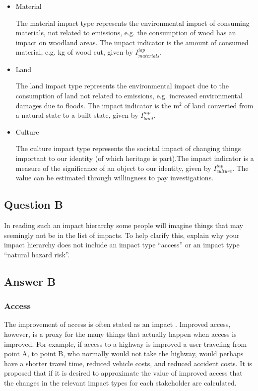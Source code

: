 \begin{enumerate}
\begin{itemize}
\item Material

The material impact type represents the environmental impact of consuming materials, not related to emissions, e.g. the consumption of wood has an impact on woodland areas. The impact indicator is the amount of consumed material, e.g. kg of wood cut, given by $I_{materials}^{iap}$. 

\item Land

The land impact type represents the environmental impact due to the consumption of land not related to emissions, e.g. increased environmental damages due to floods. The impact indicator is the m$^{2}$ of land converted from a natural state to a built state, given by $I_{land}^{iap}$. 

\item Culture

The culture impact type represents the societal impact of changing things important to our identity (of which heritage is part).The impact indicator is a measure of the significance of an object to our identity, given by $I_{culture}^{iap}$. The value can be estimated through willingness to pay investigations. 
\end{itemize}

\end{enumerate}

\subsection{Question B}

In reading such an impact hierarchy some people will imagine things that may seemingly not be in the list of impacts. To help clarify this, explain why your impact hierarchy does not include an impact type ``access'' or an impact type ``natural hazard risk''.

\subsection{Answer B}

\subsubsection{Access}

The improvement of access is often stated as an impact \citep{Kumares2007}. Improved access, however, is a proxy for the many things that actually happen when access is improved. For example, if access to a highway is improved a user traveling from point A, to point B, who normally would not take the highway, would perhaps have a shorter travel time, reduced vehicle costs, and reduced accident costs. It is proposed that if it is desired to approximate the value of improved access that the changes in the relevant impact types for each stakeholder are calculated. 

